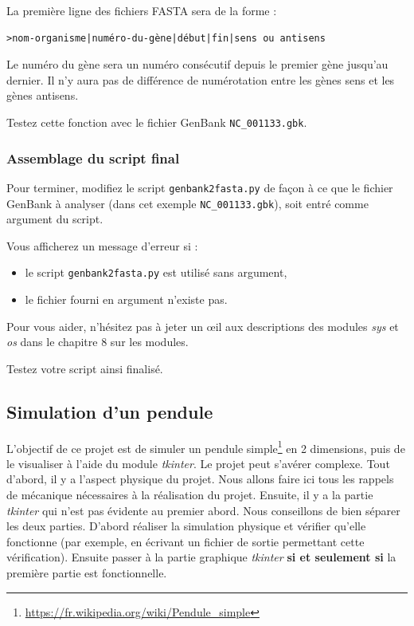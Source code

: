 \documentclass[a4paper,11pt,twoside]{book}
\renewcommand{\href}[2]{#2\footnote{\url{#1}}}
\providecommand{\tightlist}{%
  \setlength{\itemsep}{0pt}\setlength{\parskip}{0pt}}
\begin{document}
La première ligne des fichiers FASTA sera de la forme :

\begin{verbatim}
>nom-organisme|numéro-du-gène|début|fin|sens ou antisens
\end{verbatim}

Le numéro du gène sera un numéro consécutif depuis le premier gène
jusqu'au dernier. Il n'y aura pas de différence de numérotation entre
les gènes sens et les gènes antisens.

Testez cette fonction avec le fichier GenBank \texttt{NC\_001133.gbk}.

\subsubsection{Assemblage du script
final}\label{assemblage-du-script-final-1}

Pour terminer, modifiez le script \texttt{genbank2fasta.py} de façon à
ce que le fichier GenBank à analyser (dans cet exemple
\texttt{NC\_001133.gbk}), soit entré comme argument du script.

Vous afficherez un message d'erreur si :

\begin{itemize}
\tightlist
\item
  le script \texttt{genbank2fasta.py} est utilisé sans argument,
\item
  le fichier fourni en argument n'existe pas.
\end{itemize}

Pour vous aider, n'hésitez pas à jeter un œil aux descriptions des
modules \emph{sys} et \emph{os} dans le chapitre 8 sur les modules.

Testez votre script ainsi finalisé.

\subsection{Simulation d'un pendule}\label{simulation-dun-pendule}

L'objectif de ce projet est de simuler un
\href{https://fr.wikipedia.org/wiki/Pendule_simple}{pendule simple} en 2
dimensions, puis de le visualiser à l'aide du module \emph{tkinter}. Le
projet peut s'avérer complexe. Tout d'abord, il y a l'aspect physique du
projet. Nous allons faire ici tous les rappels de mécanique nécessaires
à la réalisation du projet. Ensuite, il y a la partie \emph{tkinter} qui
n'est pas évidente au premier abord. Nous conseillons de bien séparer
les deux parties. D'abord réaliser la simulation physique et vérifier
qu'elle fonctionne (par exemple, en écrivant un fichier de sortie
permettant cette vérification). Ensuite passer à la partie graphique
\emph{tkinter} \textbf{si et seulement si} la première partie est
fonctionnelle.
\end{document}
